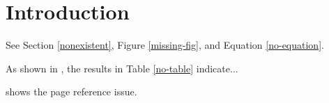 \documentclass{article}
\begin{document}
\section{Introduction}
See Section \ref{nonexistent}, Figure \ref{missing-fig}, and Equation \eqref{no-equation}.

As shown in \cite{fakereference}, the results in Table \ref{no-table} indicate...

\pageref{nowhere} shows the page reference issue.
\end{document}
